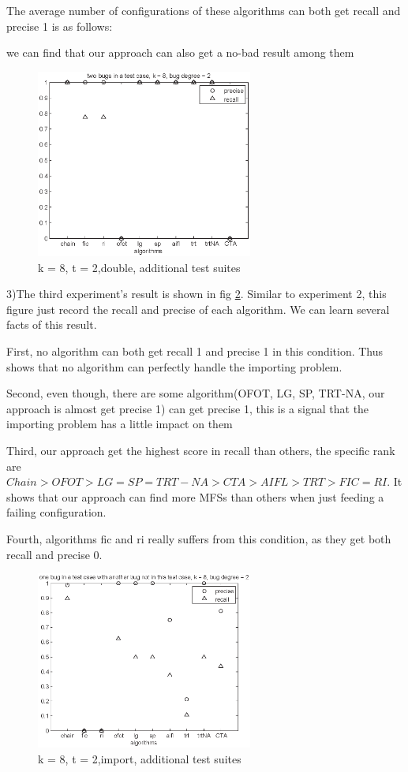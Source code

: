 \documentclass[10pt,journal,cspaper,compsoc]{IEEEtran}
\begin{document}
The average number of configurations of these algorithms can both get recall and precise 1 is as follows:

we can find that our approach can also get a no-bad result among them

\begin{figure}
 \centering
 \includegraphics[width=2.8in]{d-8-2.eps}
 \caption{k = 8, t = 2,double, additional test suites}
 \label{fig_double}
\end{figure}

3)The third experiment's result is shown in fig \ref{fig_import}. Similar to experiment 2, this figure just record the recall and precise of each algorithm. We can learn several facts of this result.

First, no algorithm can both get recall 1 and precise 1 in this condition. Thus shows that no algorithm can perfectly handle the importing problem.

Second, even though, there are some algorithm(OFOT, LG, SP, TRT-NA, our approach is almost get precise 1) can get precise 1, this is a signal that the importing problem has a little impact on them

Third, our approach get the highest score in recall than others, the specific rank are $Chain > OFOT > LG = SP = TRT-NA > CTA > AIFL > TRT > FIC = RI$. It shows that our approach can find more MFSs than others when just feeding a failing configuration.

Fourth, algorithms fic and ri really suffers from this condition, as they get both recall and precise 0.

\begin{figure}
 \centering
 \includegraphics[width=2.8in]{i-8-2.eps}
 \caption{k = 8, t = 2,import, additional test suites}
 \label{fig_import}
\end{figure}
\end{document}
